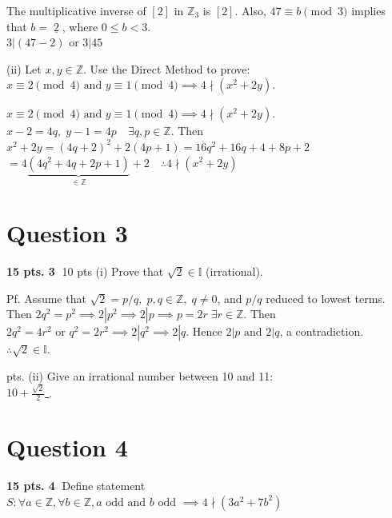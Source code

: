 \documentclass{article}
\begin{document}
\vspace{0.3cm}
\noindent The multiplicative inverse of $[2]$ in $\mathbb{Z}_3$ is \underline{$[2]$}. Also, $47 \equiv b \pmod 3$ implies that $b = \underline{\; 2 \;}$, where $0 \le b < 3$. \\
$3 | (47-2) \text{ or } 3 | 45$

\vspace{0.5cm}

\noindent (ii) Let $x, y \in \mathbb{Z}$. Use the Direct Method to prove: \\
$x \equiv 2 \pmod 4 \text{ and } y \equiv 1 \pmod 4 \implies 4 \nmid (x^2 + 2y)$.

\vspace{0.3cm}
\noindent $x \equiv 2 \pmod 4 \text{ and } y \equiv 1 \pmod 4 \implies 4 \nmid (x^2+2y)$. \\
$x - 2 = 4q, \; y - 1 = 4p \quad \exists q, p \in \mathbb{Z}$. Then \\
$x^2 + 2y = (4q+2)^2 + 2(4p+1) = 16q^2 + 16q + 4 + 8p + 2$ \\
$= 4\underbrace{(4q^2 + 4q + 2p + 1)}_{\in \mathbb{Z}} + 2 \quad \therefore 4 \nmid (x^2 + 2y)$

\vspace{0.5cm}

\section*{Question 3}
\textbf{15 pts. \textcircled{3}} 10 pts (i) Prove that $\sqrt{2} \in \mathbb{I}$ (irrational).

\vspace{0.3cm}
\noindent Pf. Assume that $\sqrt{2} = p/q, \; p, q \in \mathbb{Z}, \; q \neq 0$, and $p/q$ reduced to lowest terms. Then $2q^2 = p^2 \implies 2 | p^2 \implies 2 | p \implies p = 2r \;\exists r \in \mathbb{Z}$. Then $2q^2 = 4r^2 \text{ or } q^2 = 2r^2 \implies 2 | q^2 \implies 2 | q$. Hence $2 | p \text{ and } 2 | q$, a contradiction. \\
$\therefore \sqrt{2} \in \mathbb{I}$.

\vspace{0.5cm}
 pts. (ii) Give an irrational number between 10 and 11: \\
\underline{\quad $10 + \frac{\sqrt{2}}{2}$ \quad}.

\vspace{0.5cm}

\section*{Question 4}
\textbf{15 pts. \textcircled{4}} Define statement $S: \forall a \in \mathbb{Z}, \forall b \in \mathbb{Z}, a \text{ odd and } b \text{ odd } \implies 4 \nmid (3a^2 + 7b^2)$
\end{document}
